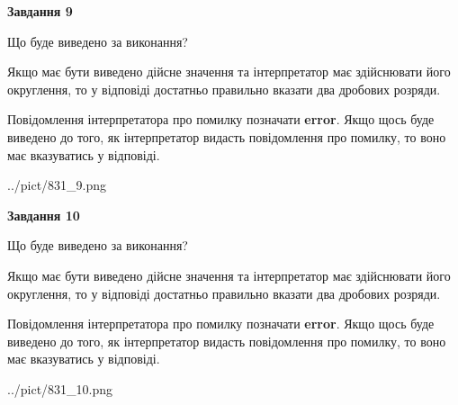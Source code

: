 \documentclass[12pt, ukrainian]{article}
\begin{document}
{\begin {Large}
{\begin {center}\textbf{Завдання 9}\end {center}}\par
Що буде виведено за виконання? \par

Якщо має бути виведено дійсне значення та інтерпретатор має здійснювати його округлення, 
то у відповіді достатньо правильно вказати два дробових розряди.

Повідомлення інтерпретатора про помилку позначати \textbf{error}.
Якщо щось буде виведено до того, як інтерпретатор видасть повідомлення про помилку, 
то воно має вказуватись у відповіді. \par

\begin{center}
	{../pict/831_9.png}
\end{center}
\newpage

{\begin {center}\textbf{Завдання 10}\end {center}}\par
Що буде виведено за виконання? \par

Якщо має бути виведено дійсне значення та інтерпретатор має здійснювати його округлення, 
то у відповіді достатньо правильно вказати два дробових розряди.

Повідомлення інтерпретатора про помилку позначати \textbf{error}.
Якщо щось буде виведено до того, як інтерпретатор видасть повідомлення про помилку, 
то воно має вказуватись у відповіді. \par

\begin{center}
	{../pict/831_10.png}
\end{center}
\newpage

\end {Large}}
\end{document}

